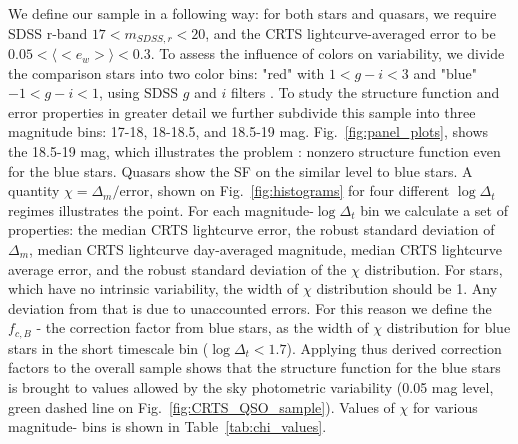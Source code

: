 \documentclass[fleqn,usenatbib]{mnras}  %
\begin{document}
We define our sample in a following way: for both stars and quasars, we require SDSS  r-band $17< m_{SDSS,r} < 20$, and the CRTS lightcurve-averaged error  to be   $0.05 < \langle <e_{w}> \rangle < 0.3$. To assess the influence of colors on variability,  we divide the comparison stars into two color bins: "red" with   $1 < g-i < 3$ and "blue" $-1 < g-i < 1$,  using SDSS $g$ and $i$ filters . To study the structure function and error properties in greater detail we further subdivide this sample into three magnitude bins: 17-18, 18-18.5, and 18.5-19 mag. Fig.~\ref{fig:panel_plots}, shows the 18.5-19 mag, which illustrates the problem : nonzero structure function even for the blue stars. Quasars show the SF on the similar level to blue stars.  A quantity $\chi = \Delta_{m}/ \mathrm{error}$, shown on Fig.~\ref{fig:histograms} for four different $\log{\Delta_{t}}$ regimes illustrates the point.  
For each magnitude-$\log{\Delta_{t}}$   bin we calculate a set of properties: the  median CRTS lightcurve error, the robust standard deviation of $\Delta_{m}$,    median CRTS lightcurve day-averaged magnitude, median CRTS lightcurve average error, and the robust standard deviation of  the $\chi$ distribution. For stars, which have no intrinsic variability, the width of $\chi$ distribution should be 1.  Any deviation from that is due to unaccounted errors. For this reason we define the $ f_{c,B}$ - the correction factor from blue stars, as the width of $\chi$ distribution for blue stars in the short timescale bin ($\log{\Delta_{t}} < 1.7$). Applying thus derived correction factors to the overall sample shows that the structure function for the blue stars is brought to values allowed by the sky photometric variability (0.05 mag level, green dashed line on Fig.~\ref{fig:CRTS_QSO_sample}). Values of $\chi$ for various magnitude-  bins is shown in Table~\ref{tab:chi_values}. 



\end{document}
